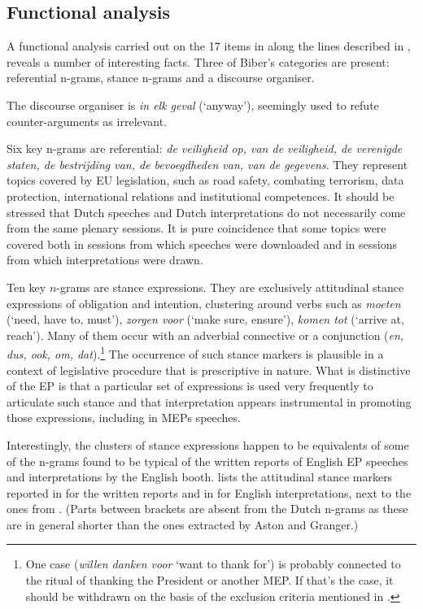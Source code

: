 \documentclass[output=paper]{langscibook}
\begin{document}
\subsection{Functional analysis}

A functional analysis carried out on the 17 items in  along the lines described in \citet{Biber2004}, reveals a number of interesting facts. Three of Biber’s categories are present: referential n-grams, stance n-grams and a discourse organiser.

The discourse organiser is \textit{in elk geval} (‘anyway’), seemingly used to refute counter-arguments as irrelevant.  

Six key n-grams are referential: \textit{de veiligheid op, van de veiligheid, de verenigde staten, de bestrijding van, de bevoegdheden van, van de gegevens}. They represent topics covered by EU legislation, such as road safety, combating terrorism, data protection, international relations and institutional competences. It should be stressed that Dutch speeches and Dutch interpretations do not necessarily come from the same plenary sessions. It is pure coincidence that some topics were covered both in sessions from which speeches were downloaded and in sessions from which interpretations were drawn.

\begin{sloppypar}
Ten key $n$-grams are stance expressions. They are exclusively attitudinal stance expressions of obligation and intention, clustering around verbs such as \textit{moeten} (‘need, have to, must’), \textit{zorgen voor} (‘make sure, ensure’), \textit{komen tot} (‘arrive at, reach’). Many of them occur with an adverbial connective or a conjunction (\textit{en, dus, ook, om, dat}).\footnote{One case (\textit{willen danken voor} ‘want to thank for’) is probably connected to the ritual of thanking the President or another MEP. If that’s the case, it should be withdrawn on the basis of the exclusion criteria mentioned in .} The occurrence of such stance markers is plausible in a context of legislative procedure that is prescriptive in nature. What is distinctive of the EP is that a particular set of expressions is used very frequently to articulate such stance and that interpretation appears instrumental in promoting those expressions, including in MEPs speeches. 
\end{sloppypar}

Interestingly, the clusters of stance expressions happen to be equivalents of some of the n-grams found to be typical of the written reports of English EP speeches and interpretations by the English booth.  lists the attitudinal stance markers reported in \citet{granger_lexical_2014} for the written reports and in \citet{Aston2018} for English interpretations, next to the ones from . (Parts between brackets are absent from the Dutch n-grams as these are in general shorter than the ones extracted by Aston and Granger.)
\end{document}
